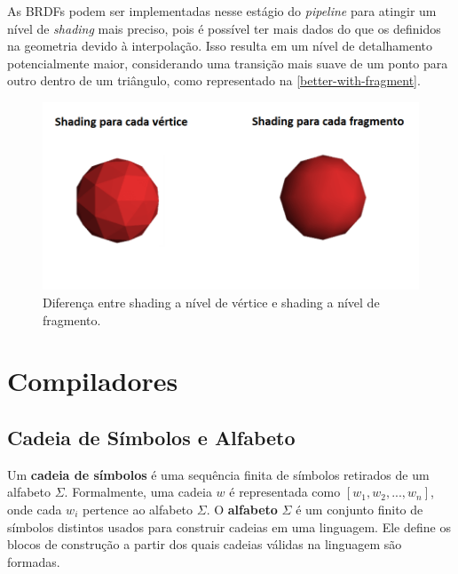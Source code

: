 \documentclass[english, 
               brazil, 
               bsc] %
               {dcomp-abntex2}
\begin{document}
As BRDFs podem ser implementadas nesse estágio do \textit{pipeline} para atingir um nível de \textit{shading} mais preciso, pois é possível ter mais dados do que os definidos na geometria devido à interpolação. Isso resulta em um nível de detalhamento potencialmente maior, considerando uma transição mais suave de um ponto para outro dentro de um triângulo,  como representado na \autoref{better-with-fragment}.




\begin{figure}[H]
        \caption{\label{better-with-fragment} \small Diferença entre shading a nível de vértice e shading a nível de fragmento.}
        \begin{center}
            \includegraphics[scale=0.5]{./Imagens/per_vertex_per_frag.png}
        \end{center}
\end{figure}


\section{Compiladores} \label{compiladores}


\subsection{Cadeia de Símbolos e Alfabeto} \label{símbolos}


Um \textbf{cadeia de símbolos} é uma sequência finita de símbolos retirados de um alfabeto $ \Sigma $. Formalmente, uma cadeia $ w $ é representada como $ [w_1, w_2, ..., w_n] $, onde cada $ w_i $ pertence ao alfabeto $ \Sigma $. O \textbf{alfabeto} $ \Sigma $ é um conjunto finito de símbolos distintos usados para construir cadeias em uma linguagem. Ele define os blocos de construção a partir dos quais cadeias válidas na linguagem são formadas.
\end{document}
